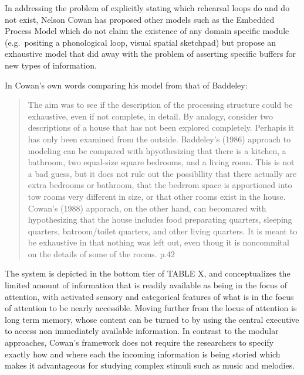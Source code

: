 \documentclass[]{book}
\theoremstyle{definition}
\theoremstyle{definition}
\theoremstyle{definition}
\theoremstyle{remark}
\begin{document}
In addressing the problem of explicitly stating which rehearsal loops do
and do not exist, Nelson Cowan has proposed other models
\citep{cowanEvolvingConceptionsMemory1988, cowanWorkingMemoryCapacity2005}
such as the Embedded Process Model which do not claim the existence of
any domain specific module (e.g.~positing a phonological loop, visual
spatial sketchpad) but propose an exhaustive model that did away with
the problem of asserting specific buffers for new types of information.

In Cowan's own words comparing his model from that of Baddeley:

\begin{quote}
The aim was to see if the description of the processing structure could
be exhaustive, even if not complete, in detail. By analogy, consider two
descriptions of a house that has not been explored completely. Perhapis
it has only been examined from the outside. Baddeley's (1986) approach
to modeling can be compared with hpyothesizing that there is a kitchen,
a bathroom, two equal-size square bedrooms, and a living room. This is
not a bad guess, but it does not rule out the possibllity that there
actually are extra bedrooms or bathroom, that the bedrrom space is
apportioned into tow rooms very different in size, or that other rooms
exist in the house. Cowan's (1988) apporach, on the other hand, can
becomared with hypothesizing that the house includes food preparating
quarters, sleeping quarters, batroom/toilet quarters, and other living
quarters. It is meant to be exhaustive in that nothing was left out,
even thoug it is noncommital on the details of some of the rooms. p.42
\end{quote}

The system is depicted in the bottom tier of TABLE X, and conceptualizes
the limited amount of information that is readily available as being in
the focus of attention, with activated sensory and categorical features
of what is in the focus of attention to be nearly accessible. Moving
further from the locus of attention is long term memory, whose content
can be turned to by using the central executive to access non
immediately available information. In contrast to the modular
approaches, Cowan's framework does not require the researchers to
specify exactly how and where each the incoming information is being
storied which makes it advantageous for studying complex stimuli such as
music and melodies.
\end{document}
